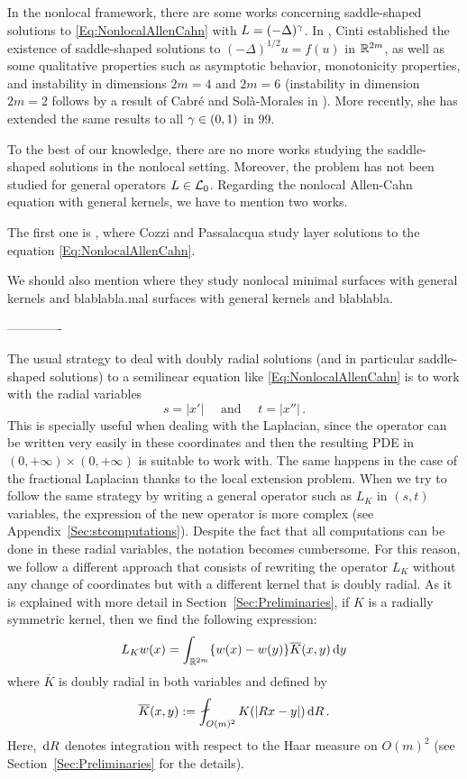 In the nonlocal framework, there are some works concerning saddle-shaped solutions to \eqref{Eq:NonlocalAllenCahn} with $L= (-\Delta)^\gamma$. In  \cite{Cinti-Saddle}, Cinti established the existence of saddle-shaped solutions to $(-\Delta)^{1/2}u = f(u)$ in $\mathbb{R}^{2m}$, as well as some qualitative properties such as asymptotic behavior, monotonicity properties, and instability in dimensions $2m = 4$ and $2m = 6$ (instability in dimension $2m=2$ follows by a result of Cabré and Solà-Morales in \cite{CabreSolaMorales}). More recently, she has extended the same results to all $\gamma \in (0,1)$ in 99.


To the best of our knowledge, there are no more works studying the saddle-shaped solutions in the nonlocal setting. Moreover, the problem has not been studied for general operators $L\in \mathcal{L}_0$. Regarding the nonlocal Allen-Cahn equation with general kernels, we have to mention two works.

The first one is \cite{CozziPassalacqua}, where Cozzi and Passalacqua study layer solutions to the equation \eqref{Eq:NonlocalAllenCahn}.

We should also mention \cite{DipierroSerraValdinoci} where they study nonlocal minimal surfaces with general kernels and blablabla.mal surfaces with general kernels and blablabla.



\bigskip
\bigskip
\bigskip
-------------
\bigskip
\bigskip
\bigskip

The usual strategy to deal with doubly radial solutions (and in particular saddle-shaped solutions) to a semilinear equation like \eqref{Eq:NonlocalAllenCahn} is to work with the radial variables 
$$
s = |x'| \quad \text{ and } \quad t=|x''|\,.
$$
This is specially useful when dealing with the Laplacian, since the operator can be written very easily in these coordinates and then the resulting PDE in $(0,+\infty)\times (0,+\infty)$ is suitable to work with. The same happens in the case of the fractional Laplacian thanks to the local extension problem. When we try to follow the same strategy by writing a general operator such as $L_K$ in $(s,t)$ variables, the expression of the new operator is more complex (see Appendix~\ref{Sec:stcomputations}). Despite the fact that all computations can be done in these radial variables, the notation becomes cumbersome. For this reason, we follow a different approach that consists of rewriting the operator $L_K$ without any change of coordinates but with a different kernel that is doubly radial. As it is explained with more detail in Section~\ref{Sec:Preliminaries}, if $K$ is a radially symmetric kernel, then we find the following expression:
$$
L_K w(x) = \int_{\mathbb{R}^{2m}} \{w(x) - w(y)\} \overline{K}(x,y) \,\mathrm{d} y
$$
where $\overline{K}$ is doubly radial in both variables and defined by
\begin{equation}
\label{Eq:KbarDef'}
\overline{K}(x,y) := \average_{O(m)^2} K(|Rx - y|)\d R\,.
\end{equation}
Here, $\,\mathrm{d} R$ denotes integration with respect to the Haar measure on $O(m)^2$ (see Section~\ref{Sec:Preliminaries} for the details).


